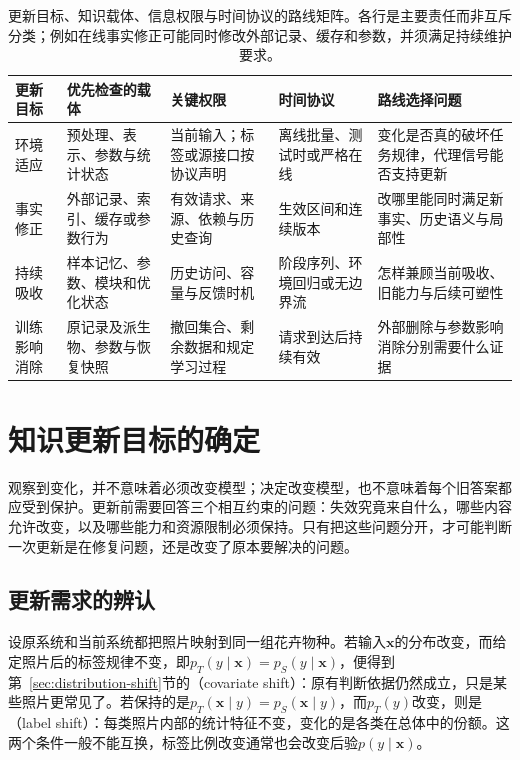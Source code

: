 \begin{table}[htbp]
\small
\begin{tabularx}{\linewidth}{@{}p{23mm}XXXX@{}}
\toprule
更新目标 & 优先检查的载体 & 关键权限 & 时间协议 & 路线选择问题 \\
\midrule
环境适应 & 预处理、表示、参数与统计状态 & 当前输入；标签或源接口按协议声明 & 离线批量、测试时或严格在线 & 变化是否真的破坏任务规律，代理信号能否支持更新 \\
事实修正 & 外部记录、索引、缓存或参数行为 & 有效请求、来源、依赖与历史查询 & 生效区间和连续版本 & 改哪里能同时满足新事实、历史语义与局部性 \\
持续吸收 & 样本记忆、参数、模块和优化状态 & 历史访问、容量与反馈时机 & 阶段序列、环境回归或无边界流 & 怎样兼顾当前吸收、旧能力与后续可塑性 \\
训练影响消除 & 原记录及派生物、参数与恢复快照 & 撤回集合、剩余数据和规定学习过程 & 请求到达后持续有效 & 外部删除与参数影响消除分别需要什么证据 \\
\bottomrule
\end{tabularx}
\caption{更新目标、知识载体、信息权限与时间协议的路线矩阵。各行是主要责任而非互斥分类；例如在线事实修正可能同时修改外部记录、缓存和参数，并须满足持续维护要求。}
\label{tab:ket-update-route-matrix}
\end{table}

\section{知识更新目标的确定}
\label{sec:ket-update-goals}

观察到变化，并不意味着必须改变模型；决定改变模型，也不意味着每个旧答案都应受到保护。更新前需要回答三个相互约束的问题：失效究竟来自什么，哪些内容允许改变，以及哪些能力和资源限制必须保持。只有把这些问题分开，才可能判断一次更新是在修复问题，还是改变了原本要解决的问题。

\subsection{更新需求的辨认}
\label{sec:ket-update-needs}

设原系统和当前系统都把照片映射到同一组花卉物种。若输入$\bm{x}$的分布改变，而给定照片后的标签规律不变，即$p_T(y\mid\bm{x})=p_S(y\mid\bm{x})$，便得到第~\ref{sec:distribution-shift}节的（covariate shift）：原有判断依据仍然成立，只是某些照片更常见了。若保持的是$p_T(\bm{x}\mid y)=p_S(\bm{x}\mid y)$，而$p_T(y)$改变，则是（label shift）：每类照片内部的统计特征不变，变化的是各类在总体中的份额。这两个条件一般不能互换，标签比例改变通常也会改变后验$p(y\mid\bm{x})$。

